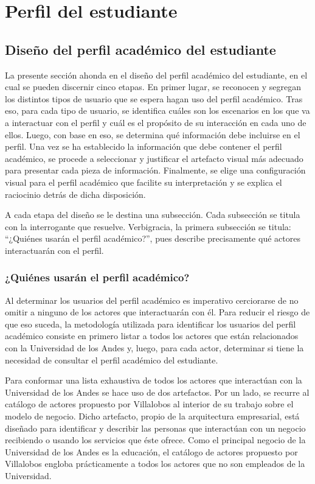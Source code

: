 \chapter{Perfil del estudiante}

\section{Diseño del perfil académico del estudiante}

La presente sección ahonda en el diseño del perfil académico del estudiante, en el cual se pueden discernir cinco etapas. En primer lugar, se reconocen y segregan los distintos tipos de usuario que se espera hagan uso del perfil académico. Tras eso, para cada tipo de usuario, se identifica cuáles son los escenarios en los que va a interactuar con el perfil y cuál es el propósito de su interacción en cada uno de ellos. Luego, con base en eso, se determina qué información debe incluirse en el perfil. Una vez se ha establecido la información que debe contener el perfil académico, se procede a seleccionar y justificar el artefacto visual más adecuado para presentar cada pieza de información. Finalmente, se elige una configuración visual para el perfil académico que facilite su interpretación y se explica el raciocinio detrás de dicha disposición.

A cada etapa del diseño se le destina una subsección. Cada subsección se titula con la interrogante que resuelve. Verbigracia, la primera subsección se titula: ``¿Quiénes usarán el perfil académico?'', pues describe precisamente qué actores interactuarán con el perfil.

\subsection{¿Quiénes usarán el perfil académico?}

Al determinar los usuarios del perfil académico es imperativo cerciorarse de no omitir a ninguno de los actores que interactuarán con él. Para reducir el riesgo de que eso suceda, la metodología utilizada para identificar los usuarios del perfil académico consiste en primero listar a todos los actores que están relacionados con la Universidad de los Andes y, luego, para cada actor, determinar si tiene la necesidad de consultar el perfil académico del estudiante.

Para conformar una lista exhaustiva de todos los actores que interactúan con la Universidad de los Andes se hace uso de dos artefactos. Por un lado, se recurre al catálogo de actores propuesto por Villalobos \cite{villalobos2021} al interior de su trabajo sobre el modelo de negocio. Dicho artefacto, propio de la arquitectura empresarial, está diseñado para identificar y describir las personas que interactúan con un negocio recibiendo o usando los servicios que éste ofrece. Como el principal negocio de la Universidad de los Andes es la educación, el catálogo de actores propuesto por Villalobos engloba prácticamente a todos los actores que no son empleados de la Universidad.

